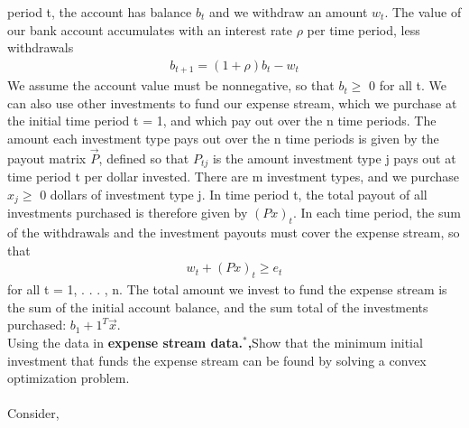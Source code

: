 \documentclass[journal,12pt,twocolumn]{IEEEtran}
\begin{document}
\begin{enumerate}
period t, the account has balance $b_t$ and we withdraw an amount $w_t$. The value of our
bank account accumulates with an interest rate $\rho$ per time period, less withdrawals
\begin{align}
b_{t+1} = (1+ \rho)b_t - w_t \nonumber
\end{align}
We assume the account value must be nonnegative, so that $b_t \geq$ 0 for all t.
We can also use other investments to fund our expense stream, which we purchase at
the initial time period t = 1, and which pay out over the n time periods. The amount
each investment type pays out over the n time periods is given by the payout matrix
$\vec{P}$, defined so that $P_{tj}$ is the amount investment type j pays out at time period t per
dollar invested. There are m investment types, and we purchase $x_j \geq$ 0 dollars of
investment type j. In time period t, the total payout of all investments purchased is
therefore given by $({P x})_{t}$.
In each time period, the sum of the withdrawals and the investment payouts must
cover the expense stream, so that
\begin{align}
w_t + ({P x})_t \geq e_t \nonumber
\end{align}
for all t = 1, . . . , n.
The total amount we invest to fund the expense stream is the sum of the initial account
balance, and the sum total of the investments purchased: $b_1 + 1^T \vec{x}$.\\
Using the data in \textbf{expense stream data.$^*$,}Show that the minimum initial investment that funds the expense stream can be
found by solving a convex optimization problem.\\
\solution\\
Consider,
\begin{table}[H]
 \centering
\end{table}
\end{enumerate}
\end{document}
